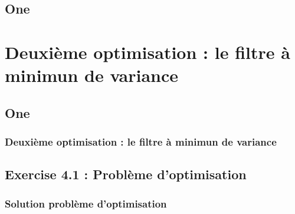 \documentclass[11pt]{beamer}
\begin{document}
\begin{frame}
	\subsection{One}
	\frametitle{}
\end{frame}

\section{Deuxième optimisation : le filtre à minimun de variance}
\begin{frame}
	\subsection{One}
	\frametitle{Deuxième optimisation : le filtre à minimun de variance}

	
\end{frame}
\subsection{Exercise 4.1 : Problème d'optimisation}
\begin{frame}

	\frametitle{Solution problème d'optimisation}
\end{frame}
\end{document}

